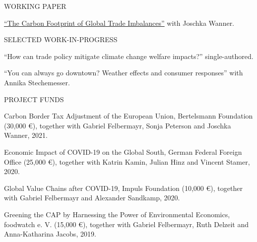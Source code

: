 \documentclass{article}
\begin{document}

\begin{minipage}[t]{0.12\textwidth}
    {\selectfont WORKING PAPER} \\
\end{minipage}
\hspace{5mm}
\begin{minipage}[t]{0.8\textwidth}
    \href{https://www.cesifo.org/en/publications/2023/working-paper/carbon-footprint-global-trade-imbalances}{``The Carbon Footprint of Global Trade Imbalances''} with Joschka Wanner. \par
\end{minipage}
\medskip


\begin{minipage}[t]{0.12\textwidth}
    {\selectfont SELECTED WORK-IN-PROGRESS} \\
\end{minipage}
\hspace{5mm}
\begin{minipage}[t]{0.8\textwidth}
    ``How can trade policy mitigate climate change welfare impacts?'' single-authored.\par
    ``You can always go downtown? Weather effects and consumer responses'' with Annika Stechemesser.\par
\end{minipage}
\medskip


\begin{minipage}[t]{0.12\textwidth}
    {\selectfont PROJECT FUNDS} \\
\end{minipage}
\hspace{5mm}
\begin{minipage}[t]{0.8\textwidth}
    Carbon Border Tax Adjustment of the European Union, Bertelsmann Foundation (30,000 \euro{}), together with Gabriel Felbermayr, Sonja Peterson and Joschka Wanner, 2021. \par
    Economic Impact of COVID-19 on the Global South, German Federal Foreign Office (25,000 \euro{}), together with Katrin Kamin, Julian Hinz and Vincent Stamer, 2020. \par
    Global Value Chains after COVID-19, Impuls Foundation (10,000 \euro{}), together with Gabriel Felbermayr and Alexander Sandkamp, 2020. \par
    Greening the CAP by Harnessing the Power of Environmental Economics, foodwatch e. V. (15,000 \euro{}), together with  Gabriel Felbermayr, Ruth Delzeit and Anna-Katharina Jacobs, 2019.
\end{minipage}
\medskip
\end{document}
